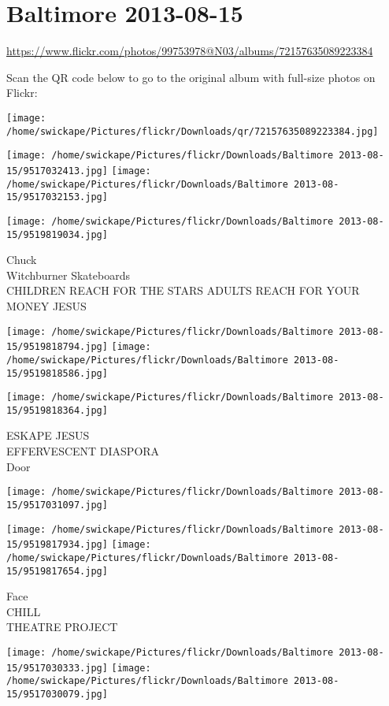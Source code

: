\documentclass[10pt,letterpaper]{article}
\title{}
\author{}
\date{}
\begin{document}
\section*{Baltimore 2013-08-15}

\url{https://www.flickr.com/photos/99753978@N03/albums/72157635089223384}

Scan the QR code below to go to the original album with full-size photos on Flickr:

\texttt{[image: /home/swickape/Pictures/flickr/Downloads/qr/72157635089223384.jpg]}
\pagebreak

\texttt{[image: /home/swickape/Pictures/flickr/Downloads/Baltimore 2013-08-15/9517032413.jpg]}
\texttt{[image: /home/swickape/Pictures/flickr/Downloads/Baltimore 2013-08-15/9517032153.jpg]}

\vspace{0.25in}
\texttt{[image: /home/swickape/Pictures/flickr/Downloads/Baltimore 2013-08-15/9519819034.jpg]}

Chuck\\
Witchburner Skateboards\\
CHILDREN REACH FOR THE STARS ADULTS REACH FOR YOUR MONEY JESUS
\pagebreak

\texttt{[image: /home/swickape/Pictures/flickr/Downloads/Baltimore 2013-08-15/9519818794.jpg]}
\texttt{[image: /home/swickape/Pictures/flickr/Downloads/Baltimore 2013-08-15/9519818586.jpg]}

\texttt{[image: /home/swickape/Pictures/flickr/Downloads/Baltimore 2013-08-15/9519818364.jpg]}

ESKAPE JESUS\\
EFFERVESCENT DIASPORA\\
Door
\pagebreak

\texttt{[image: /home/swickape/Pictures/flickr/Downloads/Baltimore 2013-08-15/9517031097.jpg]}

\vspace{0.25in}
\texttt{[image: /home/swickape/Pictures/flickr/Downloads/Baltimore 2013-08-15/9519817934.jpg]}
\texttt{[image: /home/swickape/Pictures/flickr/Downloads/Baltimore 2013-08-15/9519817654.jpg]}

Face\\
CHILL\\
THEATRE PROJECT
\pagebreak

\texttt{[image: /home/swickape/Pictures/flickr/Downloads/Baltimore 2013-08-15/9517030333.jpg]}
\texttt{[image: /home/swickape/Pictures/flickr/Downloads/Baltimore 2013-08-15/9517030079.jpg]}
\end{document}
